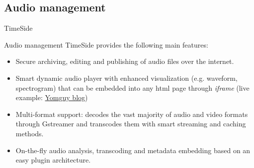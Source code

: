 \documentclass[final, hyperref, table]{beamer}
\begin{document}
\subsection{Audio management}
\begin{frame}{TimeSide}\tiny
\begin{block}{Audio management}
  TimeSide provides the following main features:
  \begin{itemize}
  \item Secure archiving, editing and publishing of audio files over
    the internet.
  \item Smart dynamic audio player with enhanced visualization (e.g. waveform,
    spectrogram) that can be embedded into any html page through \emph{iframe} (live example: \href{http://yomix.org/category/projects.html}{Yomguy blog})
  \item Multi-format support: decodes the vast majority of audio and
    video formats through Gstreamer and transcodes them with smart
    streaming and caching methods.
  \item On-the-fly audio analysis, transcoding and metadata embedding
    based on an easy plugin architecture.
  \end{itemize}
\end{block}

 
\end{frame} 
\end{document}
